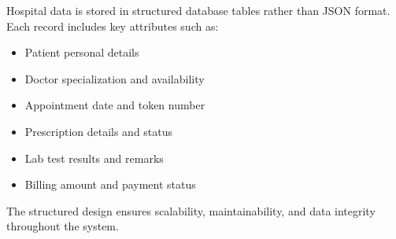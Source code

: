 Hospital data is stored in structured database tables rather than JSON format. Each record includes key attributes such as:

\begin{itemize}
    \item Patient personal details
    \item Doctor specialization and availability
    \item Appointment date and token number
    \item Prescription details and status
    \item Lab test results and remarks
    \item Billing amount and payment status
\end{itemize}

The structured design ensures scalability, maintainability, and data integrity throughout the system.